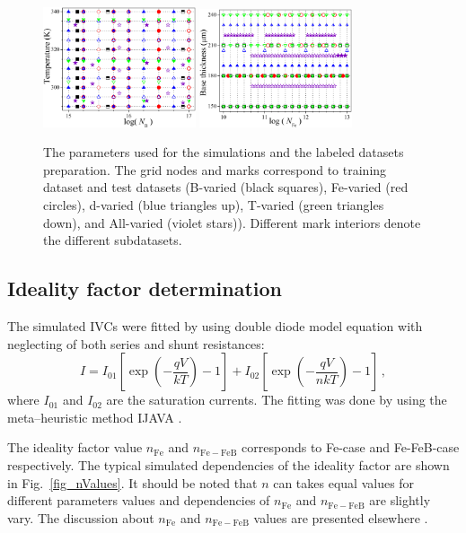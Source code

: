 \documentclass[journal]{IEEEtran}
\begin{document}
\begin{figure}[bt]
\centering
\includegraphics[width=0.4\textwidth]{FigDataA}
\includegraphics[width=0.4\textwidth]{FigDataB}
\caption{The parameters used for the simulations and the labeled datasets preparation.
The grid nodes and marks correspond to training dataset and test datasets
(B-varied (black squares), Fe-varied (red circles), d-varied (blue triangles up),
T-varied (green triangles down), and  All-varied (violet stars)).
Different mark interiors denote the  different subdatasets.
}
\label{fig_ParVal}
\end{figure}


\subsection{Ideality factor determination}

The simulated IVCs were fitted by using double diode model \cite{Breitenstein2013} equation
with neglecting of both series and shunt resistances:
\begin{equation}
\label{eqIV}
    I=I_{01}\left[\exp\left(-\frac{qV}{kT}\right)-1\right]+ I_{02}\left[\exp\left(-\frac{qV}{nkT}\right)-1\right]\,,
\end{equation}
where
$I_{01}$ and $I_{02}$ are the saturation currents.
The fitting was done by using the meta--heuristic method IJAVA \cite{IJAVA}.

The ideality factor value $n_\mathrm{Fe}$ and $n_\mathrm{Fe-FeB}$ corresponds to Fe-case and Fe-FeB-case respectively.
The typical simulated dependencies of  the ideality factor are shown in Fig.~\ref{fig_nValues}.
It should be noted that $n$ can takes equal values for different parameters values
and dependencies of $n_\mathrm{Fe}$ and $n_\mathrm{Fe-FeB}$ are slightly vary.
The discussion about $n_\mathrm{Fe}$ and $n_\mathrm{Fe-FeB}$  values are presented elsewhere \cite{OlikhJPS}.
\end{document}
